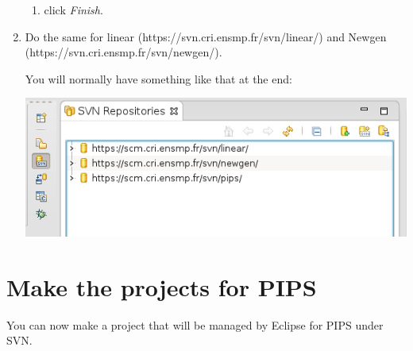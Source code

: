 \documentclass[a4paper]{article}
\begin{document}
\begin{enumerate}
\begin{enumerate}
\item click \emph{Finish}.
\end{enumerate}

\item Do the same for linear (https://svn.cri.ensmp.fr/svn/linear/) and Newgen (https://svn.cri.ensmp.fr/svn/newgen/).

You will normally have something like that at the end:
\begin{center}
\noindent
\includegraphics[scale=0.4]{eclipse/02-eclipseJUNO-newRepositories4.png}
\end{center}
\end{enumerate}


\section{Make the projects for PIPS}
\label{sec:makeproject}

You can now make a project that will be managed by Eclipse for PIPS under SVN.
\end{document}
